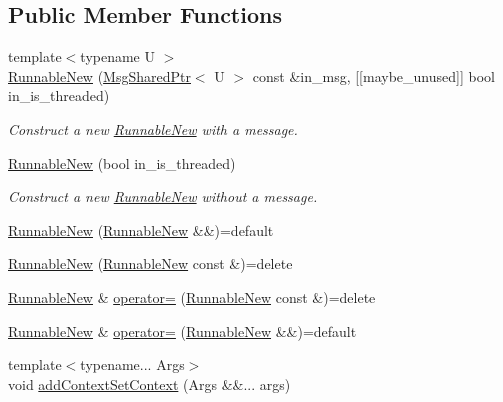 \subsection*{Public Member Functions}
\begin{DoxyCompactItemize}
\item 
{\footnotesize template$<$typename U $>$ }\\\hyperlink{structvt_1_1runnable_1_1_runnable_new_a89c5a19ee5a150199c46801c876d39e7}{Runnable\+New} (\hyperlink{namespacevt_ab2b3d506ec8e8d1540aede826d84a239}{Msg\+Shared\+Ptr}$<$ U $>$ const \&in\+\_\+msg, \mbox{[}\mbox{[}maybe\+\_\+unused\mbox{]}\mbox{]} bool in\+\_\+is\+\_\+threaded)
\begin{DoxyCompactList}\small\item\em Construct a new {\ttfamily \hyperlink{structvt_1_1runnable_1_1_runnable_new}{Runnable\+New}} with a message. \end{DoxyCompactList}\item 
\hyperlink{structvt_1_1runnable_1_1_runnable_new_a55ff785753c781903bf932a1e5faddd7}{Runnable\+New} (bool in\+\_\+is\+\_\+threaded)
\begin{DoxyCompactList}\small\item\em Construct a new {\ttfamily \hyperlink{structvt_1_1runnable_1_1_runnable_new}{Runnable\+New}} without a message. \end{DoxyCompactList}\item 
\hyperlink{structvt_1_1runnable_1_1_runnable_new_ac7e1d836710c2d0cd2791f1a1c5ac03c}{Runnable\+New} (\hyperlink{structvt_1_1runnable_1_1_runnable_new}{Runnable\+New} \&\&)=default
\item 
\hyperlink{structvt_1_1runnable_1_1_runnable_new_a4c34cf076ffd914c3d18aca7d2ff28db}{Runnable\+New} (\hyperlink{structvt_1_1runnable_1_1_runnable_new}{Runnable\+New} const \&)=delete
\item 
\hyperlink{structvt_1_1runnable_1_1_runnable_new}{Runnable\+New} \& \hyperlink{structvt_1_1runnable_1_1_runnable_new_a12c7ddbd735a9bf704b06ecea7c26e60}{operator=} (\hyperlink{structvt_1_1runnable_1_1_runnable_new}{Runnable\+New} const \&)=delete
\item 
\hyperlink{structvt_1_1runnable_1_1_runnable_new}{Runnable\+New} \& \hyperlink{structvt_1_1runnable_1_1_runnable_new_a3561cbcbc3197074cded8da204e98924}{operator=} (\hyperlink{structvt_1_1runnable_1_1_runnable_new}{Runnable\+New} \&\&)=default
\item 
{\footnotesize template$<$typename... Args$>$ }\\void \hyperlink{structvt_1_1runnable_1_1_runnable_new_a37c77d1949cd1590b74d286814bed1ef}{add\+Context\+Set\+Context} (Args \&\&... args)

\end{DoxyCompactItemize}
